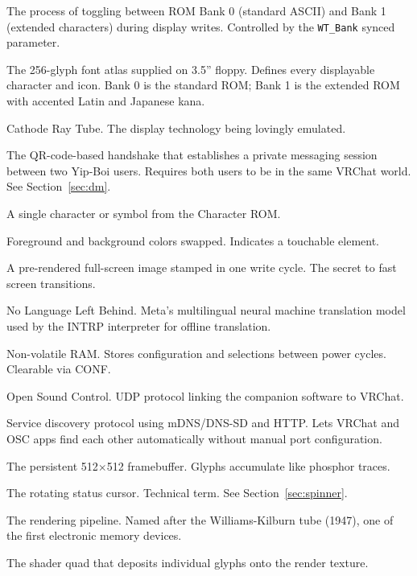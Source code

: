 \documentclass[10pt]{article}
\begin{document}
\begin{description}[style=nextline, leftmargin=1em, font=\ttfamily\bfseries]
  \item[Bank Switching]
    The process of toggling between ROM Bank 0 (standard ASCII) and Bank 1 (extended characters) during display writes. Controlled by the \texttt{WT\_Bank} synced parameter.

  \item[Character ROM]
    The 256-glyph font atlas supplied on 3.5'' floppy. Defines every displayable character and icon. Bank 0 is the standard ROM; Bank 1 is the extended ROM with accented Latin and Japanese kana.

  \item[CRT]
    Cathode Ray Tube. The display technology being lovingly emulated.

  \item[DM Pairing]
    The QR-code-based handshake that establishes a private messaging session between two Yip-Boi users. Requires both users to be in the same VRChat world. See Section~\ref{sec:dm}.

  \item[Glyph]
    A single character or symbol from the Character ROM.

  \item[Inverted Video]
    Foreground and background colors swapped. Indicates a touchable element.

  \item[Macro Glyph]
    A pre-rendered full-screen image stamped in one write cycle. The secret to fast screen transitions.

  \item[NLLB]
    No Language Left Behind. Meta's multilingual neural machine translation model used by the INTRP interpreter for offline translation.

  \item[NVRAM]
    Non-volatile RAM. Stores configuration and selections between power cycles. Clearable via CONF.

  \item[OSC]
    Open Sound Control. UDP protocol linking the companion software to VRChat.

  \item[OSC Query]
    Service discovery protocol using mDNS/DNS-SD and HTTP. Lets VRChat and OSC apps find each other automatically without manual port configuration.

  \item[Render Texture]
    The persistent 512$\times$512 framebuffer. Glyphs accumulate like phosphor traces.

  \item[Spinnyboi]
    The rotating status cursor. Technical term. See Section~\ref{sec:spinner}.

  \item[Williams Tube]
    The rendering pipeline. Named after the Williams-Kilburn tube (1947), one of the first electronic memory devices.

  \item[Write Head]
    The shader quad that deposits individual glyphs onto the render texture.
\end{description}
\end{document}
